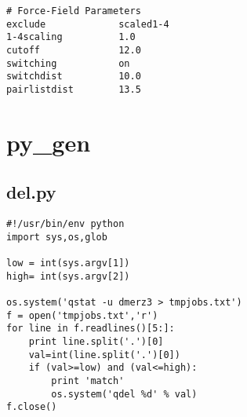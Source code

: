 \documentclass[11pt]{article}
\begin{document}
\begin{verbatim}
# Force-Field Parameters
exclude             scaled1-4
1-4scaling          1.0
cutoff              12.0
switching           on
switchdist          10.0
pairlistdist        13.5
\end{verbatim}

\section{py\_gen}


\subsection{del.py}
\begin{verbatim}
#!/usr/bin/env python
import sys,os,glob

low = int(sys.argv[1])
high= int(sys.argv[2])

os.system('qstat -u dmerz3 > tmpjobs.txt')
f = open('tmpjobs.txt','r')
for line in f.readlines()[5:]:
    print line.split('.')[0]
    val=int(line.split('.')[0])
    if (val>=low) and (val<=high):
        print 'match'
        os.system('qdel %d' % val)
f.close()
\end{verbatim}
\end{document}
